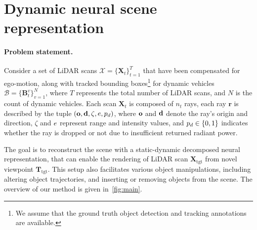 \section{Dynamic neural scene representation}

\paragraph{Problem statement.} 
Consider a set of LiDAR scans $\mathcal{X} = \{\mathbf{X}_t\}_{t=1}^T$ that have been compensated for ego-motion, along with tracked bounding boxes\footnote{We assume that the ground truth object detection and tracking annotations are available.} for dynamic vehicles $\mathcal{B} = \{\mathbf{B}_t^v\}_{v=1}^{N}$, where $T$ represents the total number of LiDAR scans, and $N$ is the count of dynamic vehicles. Each scan $\mathbf{X}_t$ is composed of $n_t$ rays, each ray $\mathbf{r}$ is described by the tuple $(\mathbf{o}, \mathbf{d}, \zeta, e, p_d)$, where $\mathbf{o}$ and $\mathbf{d}$ denote the ray's origin and direction, $\zeta$ and $e$ represent range and intensity values, and $p_d \in \{0,1\}$ indicates whether the ray is dropped or not due to insufficient returned radiant power.


The goal is to reconstruct the scene with a static-dynamic decomposed neural representation, that can enable the rendering of LiDAR scan $\mathbf{X}_{\text{tgt}}$ from novel viewpoint $\mathbf{T}_{\text{tgt}}$. This setup also facilitates various object manipulations, including altering object trajectories, and inserting or removing objects from the scene. The overview of our method is given in~\cref{fig:main}.

